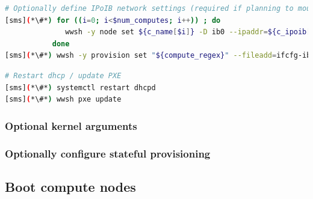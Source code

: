 \documentclass[letterpaper]{article}
\begin{document}
\begin{lstlisting}[language=bash,keywords={},upquote=true,basicstyle=\footnotesize\ttfamily]
# Optionally define IPoIB network settings (required if planning to mount Lustre over IB)
[sms](*\#*) for ((i=0; i<$num_computes; i++)) ; do
              wwsh -y node set ${c_name[$i]} -D ib0 --ipaddr=${c_ipoib[$i]} --netmask=${ipoib_netmask}
           done
[sms](*\#*) wwsh -y provision set "${compute_regex}" --fileadd=ifcfg-ib0.ww
\end{lstlisting}



\begin{lstlisting}[language=bash,keywords={},upquote=true,basicstyle=\footnotesize\ttfamily]
# Restart dhcp / update PXE
[sms](*\#*) systemctl restart dhcpd
[sms](*\#*) wwsh pxe update
\end{lstlisting}

\subsubsection{Optional kernel arguments} \label{sec:optional_kargs}


\subsubsection{Optionally configure stateful provisioning}


\vspace*{-0.1cm}
\subsection{Boot compute nodes} \label{sec:boot_computes}
 
\end{document}
